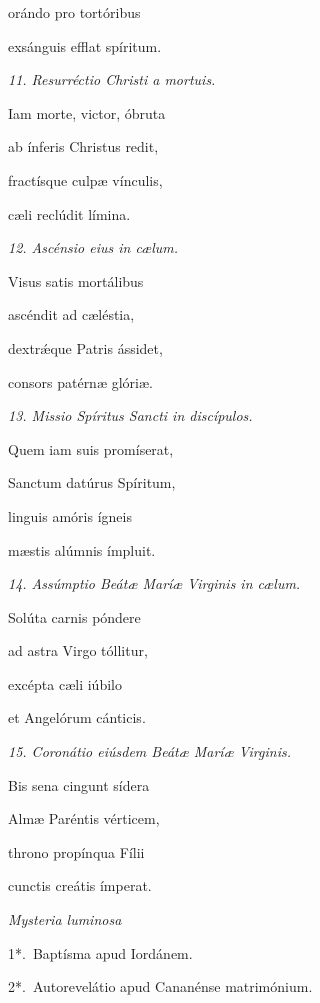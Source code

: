 \documentclass[12pt,a6paper]{book}
\newcommand{\centeredtext}[1]{\parbox{\linewidth}{\centering\textit{#1}}}
\begin{document}
\begin{sloppy}
orándo pro tortóribus

exsánguis efflat spíritum.

\vspace{3mm}

\textit{11. Resurréctio Christi a mortuis.}

Iam morte, victor, óbruta

ab ínferis Christus redit,

fractísque culpæ vínculis,

cæli reclúdit límina.

\vspace{3mm}

\textit{12. Ascénsio eius in cælum.}

Visus satis mortálibus

ascéndit ad cæléstia,

dextrǽque Patris ássidet,

consors patérnæ glóriæ.

\vspace{3mm}

\textit{13. Missio Spíritus Sancti in discípulos.}

Quem iam suis promíserat,

Sanctum datúrus Spíritum,

linguis amóris ígneis

mæstis alúmnis ímpluit.

\vspace{3mm}

\textit{14. Assúmptio Beátæ Maríæ Virginis in cælum.}

Solúta carnis póndere

ad astra Virgo tóllitur,

excépta cæli iúbilo

et Angelórum cánticis.

\vspace{3mm}

\textit{15. Coronátio eiúsdem Beátæ Maríæ Virginis.}

Bis sena cingunt sídera

Almæ Paréntis vérticem,

throno propínqua Fílii

cunctis creátis ímperat.

\vspace{3mm}

\centeredtext{Mysteria luminosa}

1*.~Baptísma apud Iordánem.

2*.~Autorevelátio apud Ca\-na\-nén\-se ma\-tri\-mó\-ni\-um.


\end{sloppy}
\end{document}
